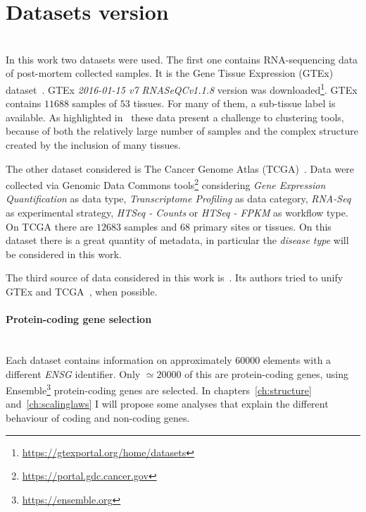 \section{Datasets version}\mbox{}\\
In this work two datasets were used. The first one contains RNA-sequencing data of post-mortem collected samples. It is the Gene Tissue Expression (GTEx) dataset~\cite{carithers2015novel}. GTEx \textit{2016-01-15 v7 RNASeQCv1.1.8} version was downloaded\footnote{\url{https://gtexportal.org/home/datasets}}.
GTEx contains $11688$ samples of $53$ tissues. For many of them, a sub-tissue label is available. As highlighted in~\cite{dey2017visualizing} these data present a challenge to clustering tools, because of both the relatively large number of samples and the complex structure created by the inclusion of many tissues.

The other dataset considered is The Cancer Genome Atlas (TCGA)~\cite{grossman2016toward}. Data were collected via Genomic Data Commons tools\footnote{\url{https://portal.gdc.cancer.gov}} considering \textit{Gene Expression Quantification} as data type, \textit{Transcriptome Profiling} as data category, \textit{RNA-Seq} as experimental strategy, \textit{HTSeq - Counts} or \textit{HTSeq - FPKM} as workflow type. On TCGA there are $12683$ samples and $68$ primary sites or tissues. On this dataset there is a great quantity of metadata, in particular the \textit{disease type} will be considered in this work.

The third source of data considered in this work is~\cite{Wang2017}. Its authors tried to unify GTEx and TCGA~\cite{Betel2018}, when possible.

\paragraph{Protein-coding gene selection}\mbox{}\\
Each dataset contains information on approximately $60000$ elements with a different \textit{ENSG} identifier. Only $\simeq 20000$ of this are protein-coding genes, using Ensemble\footnote{\url{https://ensemble.org}} protein-coding genes are selected. In chapters~\ref{ch:structure} and~\ref{ch:scalinglaws} I will propose some analyses that explain the different behaviour of coding and non-coding genes.